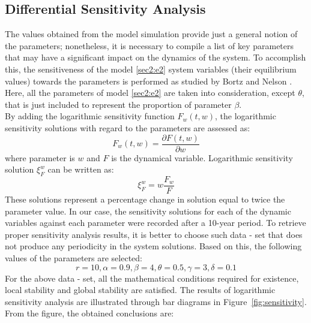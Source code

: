 \documentclass[12pt,a4wide]{report}
\numberwithin{equation}{chapter}
\numberwithin{theorem}{chapter}
\begin{document}
\subsection{Differential Sensitivity Analysis}
The values obtained from the model simulation provide just a general notion of the parameters; nonetheless, it is necessary to compile a list of key parameters that may have a significant impact on the dynamics of the system. To accomplish this, the sensitiveness of the model \eqref{sec2:e2} system variables (their equilibrium values) towards the parameters is performed as studied by Bortz and Nelson \cite{bortz2004}. Here, all the parameters of model \eqref{sec2:e2} are taken into consideration, except $\theta$, that is just included to represent the  proportion of parameter $\beta$.\\
By adding the logarithmic sensitivity function $F_w(t,w)$, the logarithmic sensitivity solutions with regard to the parameters are assessed as:
\begin{equation}\label{sec5:e1}
F_w(t,w)=\frac{\partial F(t,w)}{\partial w}
\end{equation}
where parameter is $w$ and $F$ is the dynamical variable. Logarithmic sensitivity solution $\xi^w_F$ can be written as:
\begin{equation}\label{sec5:e2}
\xi^w_F=w\frac{F_w}{F}
\end{equation}
These solutions represent a percentage change in solution equal to twice the parameter value. In our case, the sensitivity solutions for each of the dynamic variables against each parameter were recorded after a 10-year period. To retrieve proper sensitivity analysis results, it is better to choose such data - set that does not produce any periodicity in the system solutions.  Based on this, the following values of the parameters are selected:
\begin{equation}\label{parameters-for-sen}
r = 10, \alpha=0.9, \beta=4, \theta=0.5, \gamma=3, \delta=0.1
\end{equation}
For the above data - set,  all the mathematical conditions required for existence, local stability and global stability are satisfied. The results of logarithmic sensitivity analysis are illustrated through bar diagrams in  Figure~\ref{fig:sensitivity}. From the figure, the obtained conclusions are:
\end{document}
